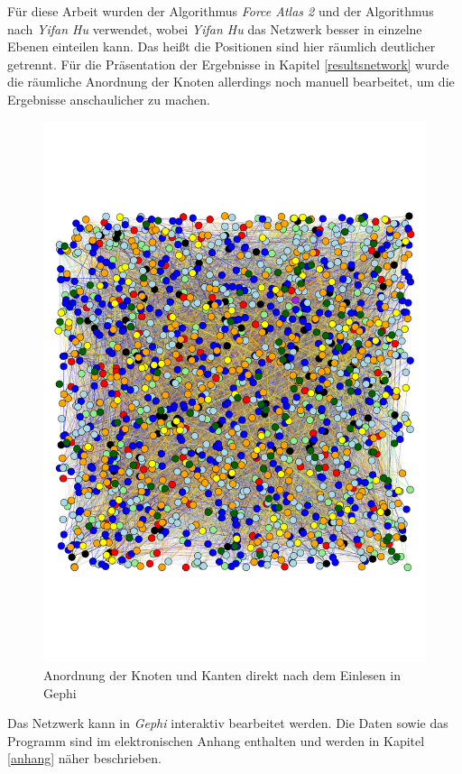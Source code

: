 Für diese Arbeit wurden der Algorithmus \textit{Force Atlas 2} \cite{forceatlas2} und der Algorithmus nach \textit{Yifan Hu} \cite{yifanhu} verwendet, wobei \textit{Yifan Hu} das Netzwerk besser in einzelne Ebenen einteilen kann. Das heißt die Positionen sind hier räumlich deutlicher getrennt. Für die Präsentation der Ergebnisse in Kapitel \ref{resultsnetwork} wurde die räumliche Anordnung der Knoten allerdings noch manuell bearbeitet, um die Ergebnisse anschaulicher zu machen.\\
\begin{figure}[H]
	\centering\includegraphics[scale=0.5]{graphbegin.pdf}\caption[Anordnung der Knoten nach dem Einlesen]{Anordnung der Knoten und Kanten direkt nach dem Einlesen in Gephi}\label{graphbegin}
\end{figure}
\noindent Das Netzwerk kann in \textit{Gephi} interaktiv bearbeitet werden. Die Daten sowie das Programm sind im elektronischen Anhang enthalten und werden in Kapitel \ref{anhang} näher beschrieben.



